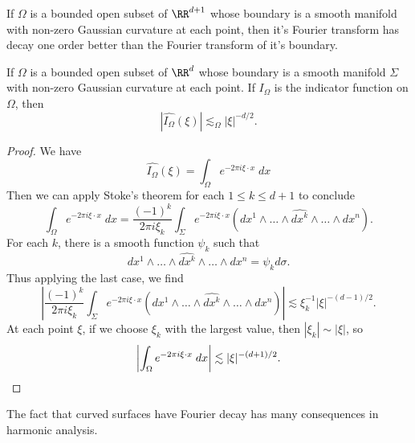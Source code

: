 If $\Omega$ is a bounded open subset of $\RR^{d+1}$ whose boundary is a smooth manifold with non-zero Gaussian curvature at each point, then it's Fourier transform has decay one order better than the Fourier transform of it's boundary.

\begin{corollary}
  If $\Omega$ is a bounded open subset of $\RR^d$ whose boundary is a smooth manifold $\Sigma$ with non-zero Gaussian curvature at each point. If $I_\Omega$ is the indicator function on $\Omega$, then
  \[ |\widehat{I_\Omega}(\xi)| \lesssim_\Omega |\xi|^{-d/2}. \]
\end{corollary}
\begin{proof}
  We have
  \[ \widehat{I_\Omega}(\xi) = \int_\Omega e^{-2 \pi i \xi \cdot x}\; dx \]
  Then we can apply Stoke's theorem for each $1 \leq k \leq d+1$ to conclude
  \[ \int_\Omega e^{-2 \pi i \xi \cdot x}\; dx = \frac{(-1)^k}{2 \pi i \xi_k} \int_\Sigma e^{-2 \pi i \xi \cdot x} (dx^1 \wedge \dots \wedge \widehat{dx^k} \wedge \dots \wedge dx^n). \]
  For each $k$, there is a smooth function $\psi_k$ such that
  \[ dx^1 \wedge \dots \wedge \widehat{dx^k} \wedge \dots \wedge dx^n = \psi_k d\sigma. \]
  Thus applying the last case, we find
  \[ \left| \frac{(-1)^k}{2 \pi i \xi_k} \int_\Sigma e^{-2 \pi i \xi \cdot x} (dx^1 \wedge \dots \wedge \widehat{dx^k} \wedge \dots \wedge dx^n) \right| \lesssim \xi_k^{-1} |\xi|^{-(d-1)/2}. \]
  At each point $\xi$, if we choose $\xi_k$ with the largest value, then $|\xi_k| \sim |\xi|$, so
  \[ \left| \int_\Omega e^{-2 \pi i \xi \cdot x}\; dx \right| \lesssim |\xi|^{-(d+1)/2}. \qedhere \]
\end{proof}

The fact that curved surfaces have Fourier decay has many consequences in harmonic analysis.

